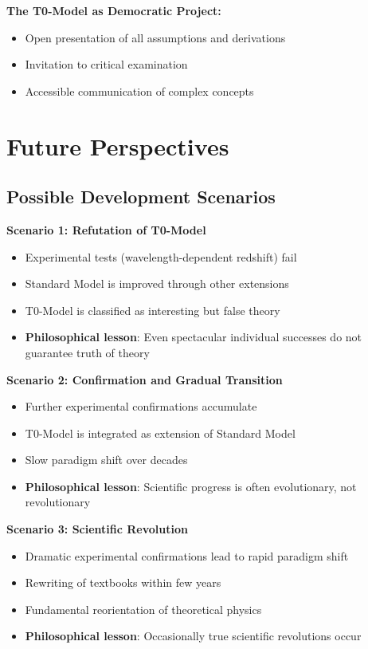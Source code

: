 \documentclass[12pt,a4paper]{report}
\begin{document}
	\textbf{The T0-Model as Democratic Project:}
	\begin{itemize}
		\item Open presentation of all assumptions and derivations
		\item Invitation to critical examination
		\item Accessible communication of complex concepts
	\end{itemize}
	
	\section{Future Perspectives}\label{sec:future_perspectives}
	
	\subsection{Possible Development Scenarios}\label{subsec:development_scenarios}
	
	\textbf{Scenario 1: Refutation of T0-Model}
	\begin{itemize}
		\item Experimental tests (wavelength-dependent redshift) fail
		\item Standard Model is improved through other extensions
		\item T0-Model is classified as interesting but false theory
		\item \textbf{Philosophical lesson}: Even spectacular individual successes do not guarantee truth of theory
	\end{itemize}
	
	\textbf{Scenario 2: Confirmation and Gradual Transition}
	\begin{itemize}
		\item Further experimental confirmations accumulate
		\item T0-Model is integrated as extension of Standard Model
		\item Slow paradigm shift over decades
		\item \textbf{Philosophical lesson}: Scientific progress is often evolutionary, not revolutionary
	\end{itemize}
	
	\textbf{Scenario 3: Scientific Revolution}
	\begin{itemize}
		\item Dramatic experimental confirmations lead to rapid paradigm shift
		\item Rewriting of textbooks within few years
		\item Fundamental reorientation of theoretical physics
		\item \textbf{Philosophical lesson}: Occasionally true scientific revolutions occur
	\end{itemize}
	
\end{document}

